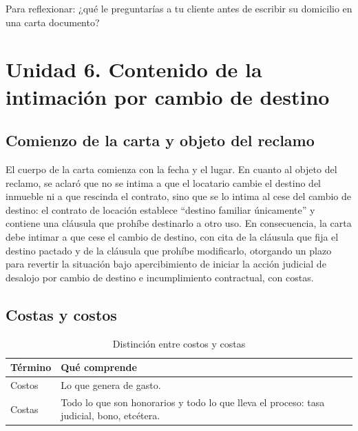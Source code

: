 \documentclass[12pt,oneside]{book}
\begin{document}
\begin{note}
Para reflexionar: ¿qué le preguntarías a tu cliente antes de escribir su domicilio en una carta documento?
\end{note}

\section*{Unidad 6. Contenido de la intimación por cambio de destino}

\subsection*{Comienzo de la carta y objeto del reclamo}

El cuerpo de la carta comienza con la fecha y el lugar. En cuanto al objeto del reclamo, se aclaró que no se intima a que el locatario cambie el destino del inmueble ni a que rescinda el contrato, sino que se lo intima al cese del cambio de destino: el contrato de locación establece ``destino familiar únicamente'' y contiene una cláusula que prohíbe destinarlo a otro uso. En consecuencia, la carta debe intimar a que cese el cambio de destino, con cita de la cláusula que fija el destino pactado y de la cláusula que prohíbe modificarlo, otorgando un plazo para revertir la situación bajo apercibimiento de iniciar la acción judicial de desalojo por cambio de destino e incumplimiento contractual, con costas.

\subsection*{Costas y costos}

\begin{table}[H]
\centering
\caption{Distinción entre costos y costas}
\begin{tabular}{@{}ll@{}}
\toprule
\textbf{Término} & \textbf{Qué comprende} \\
\midrule
Costos & Lo que genera de gasto. \\
Costas & Todo lo que son honorarios y todo lo que lleva el proceso: tasa judicial, bono, etcétera. \\
\bottomrule
\end{tabular}
\end{table}
\end{document}

